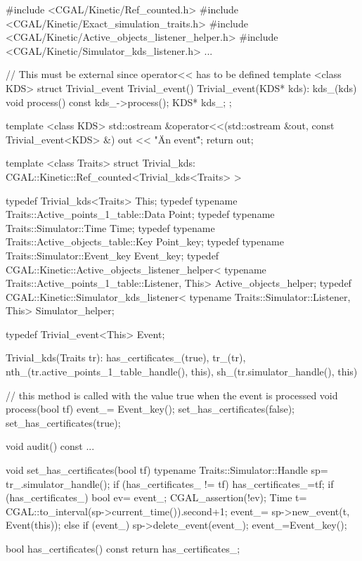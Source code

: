  \label{fig:kds_trivial_usage_program}

\begin{ccExampleCode}
#include <CGAL/Kinetic/Ref_counted.h>
#include <CGAL/Kinetic/Exact_simulation_traits.h>
#include <CGAL/Kinetic/Active_objects_listener_helper.h>
#include <CGAL/Kinetic/Simulator_kds_listener.h>
...

// This must be external since operator<< has to be defined
template <class KDS>
struct Trivial_event
{
  Trivial_event(){}
  Trivial_event(KDS* kds): kds_(kds) {
  }
  void process() const
  {
    kds_->process();
  }
  KDS* kds_;
};

template <class KDS>
std::ostream &operator<<(std::ostream &out,
			 const Trivial_event<KDS> &) {
  out << "\"An event\"";
  return out;
}


template <class Traits>
struct Trivial_kds: CGAL::Kinetic::Ref_counted<Trivial_kds<Traits> >
{
  typedef Trivial_kds<Traits> This;
  typedef typename Traits::Active_points_1_table::Data Point;
  typedef typename Traits::Simulator::Time Time;
  typedef typename Traits::Active_objects_table::Key Point_key;
  typedef typename Traits::Simulator::Event_key Event_key;
  typedef CGAL::Kinetic::Active_objects_listener_helper<
    typename Traits::Active_points_1_table::Listener, This> Active_objects_helper;
  typedef CGAL::Kinetic::Simulator_kds_listener<
    typename Traits::Simulator::Listener, This> Simulator_helper;

  typedef Trivial_event<This> Event;

  Trivial_kds(Traits tr): has_certificates_(true),
			  tr_(tr),
			  nth_(tr.active_points_1_table_handle(), this),
			  sh_(tr.simulator_handle(), this){}

  // this method is called with the value true when the event is processed
  void process(bool tf) {
     event_= Event_key();
     set_has_certificates(false);
     set_has_certificates(true);
  }

  void audit() const
  {
     ...
  }

  void set_has_certificates(bool tf) {
    typename Traits::Simulator::Handle sp= tr_.simulator_handle();
    if (has_certificates_ != tf) {
      has_certificates_=tf;
      if (has_certificates_) {
	bool ev= event_;
	CGAL_assertion(!ev);
	Time t= CGAL::to_interval(sp->current_time()).second+1;
	event_= sp->new_event(t, Event(this));
      } else if (event_) {
	sp->delete_event(event_);
	event_=Event_key();
      }
    }
  }

  bool has_certificates() const {
    return has_certificates_;
  }

}
\end{ccExampleCode}

